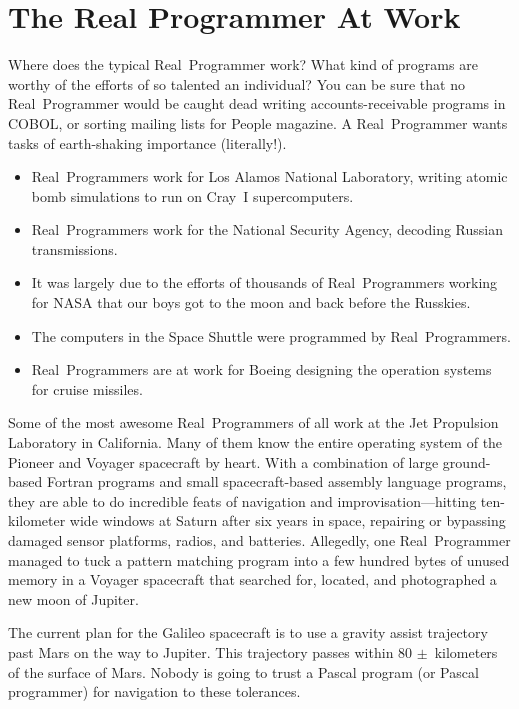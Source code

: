 \documentclass[10pt,letterpaper]{article}
\newcommand{\acro}[1]{{\small #1\spacefactor1000}}
\begin{document}
\section*{The Real Programmer At Work}
Where does the typical Real~Programmer work? What kind
of programs are worthy of the efforts of so talented an individual?
You can be sure that no Real~Programmer would be caught dead writing
accounts-receivable programs in \acro{COBOL}, or sorting mailing lists for
People magazine. A Real~Programmer wants tasks of earth-shaking
importance (literally!).
\begin{itemize}
\item Real~Programmers work for Los Alamos National Laboratory, writing atomic bomb simulations to run on Cray~I supercomputers.
\item Real~Programmers work for the National Security Agency, decoding Russian transmissions.
\item It was largely due to the efforts of thousands of Real~Programmers working for \acro{NASA} that our boys got to the moon and back before the Russkies.
\item The computers in the Space Shuttle were programmed by Real~Programmers.
\item Real~Programmers are at work for Boeing designing the operation systems for cruise missiles.
\end{itemize}
Some of the most awesome Real~Programmers of all work at the Jet
Propulsion Laboratory in California. Many of them know the entire
operating system of the Pioneer and Voyager spacecraft by heart. With
a combination of large ground-based Fortran programs and small
spacecraft-based assembly language programs, they are able to do
incredible feats of navigation and improvisation---hitting
ten-kilometer wide windows at Saturn after six years in space,
repairing or bypassing damaged sensor platforms, radios, and
batteries. Allegedly, one Real~Programmer managed to tuck a pattern
matching program into a few hundred bytes of unused memory in a
Voyager spacecraft that searched for, located, and photographed a new
moon of Jupiter.

The current plan for the Galileo spacecraft is to use a gravity assist
trajectory past Mars on the way to Jupiter. This trajectory passes
within 80 $\pm$~kilometers of the surface of Mars. Nobody is going to
trust a Pascal program (or Pascal programmer) for navigation to these
tolerances.
\end{document}
